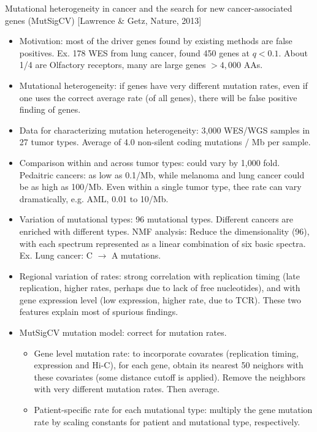 \documentclass{report}
\begin{document}
Mutational heterogeneity in cancer and the search for new cancer-associated genes (MutSigCV) [Lawrence \& Getz, Nature, 2013]
\begin{itemize}
	\item Motivation: most of the driver genes found by existing methods are false positives. Ex. 178 WES from lung cancer, found 450 genes at $q < 0.1$. About 1/4 are Olfactory receptors, many are large genes $>4,000$ AAs.  
	
	\item Mutational heterogeneity: if genes have very different mutation rates, even if one uses the correct average rate (of all genes), there will be false positive finding of genes. 
	
	\item Data for characterizing mutation heterogeneity: 3,000 WES/WGS samples in 27 tumor types. Average of 4.0 non-silent coding mutations / Mb per sample.  
	
	\item Comparison within and across tumor types: could vary by 1,000 fold. Pedaitric cancers: as low as 0.1/Mb, while melanoma and lung cancer could be as high as 100/Mb. Even within a single tumor type, thee rate can vary dramatically, e.g. AML, 0.01 to 10/Mb. 
	
	\item Variation of mutational types: 96 mutational types. Different cancers are enriched with different types. NMF analysis: Reduce the dimensionality (96), with each spectrum represented as a linear combination of six basic spectra. Ex. Lung cancer: C $\rightarrow$ A mutations. 
	
	\item Regional variation of rates: strong correlation with replication timing (late replication, higher rates, perhaps due to lack of free nucleotides), and with gene expression level (low expression, higher rate, due to TCR). These two features explain most of spurious findings. 
	
	\item MutSigCV mutation model: correct for mutation rates. 
	\begin{itemize}
		\item Gene level mutation rate: to incorporate covarates (replication timing, expression and Hi-C), for each gene, obtain its nearest 50 neighors with these covariates (some distance cutoff is applied). Remove the neighbors with very different mutation rates. Then average. 
		
		\item Patient-specific rate for each mutational type: multiply the gene mutation rate by scaling constants for patient and mutational type, respectively. 
	\end{itemize} 
	

\end{itemize}
\end{document}
